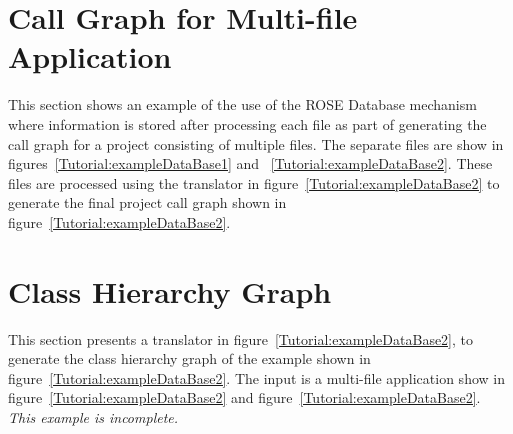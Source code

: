 \section{Call Graph for Multi-file Application}

   This section shows an example of the use of the ROSE Database mechanism
where information is stored after processing each file as part of generating the
call graph for a project consisting of multiple files.  The separate files
are show in figures~\ref{Tutorial:exampleDataBase1} and ~\ref{Tutorial:exampleDataBase2}.
These files are processed using the translator in figure~\ref{Tutorial:exampleDataBase2}
to generate the final project call graph shown in figure~\ref{Tutorial:exampleDataBase2}.



\section{Class Hierarchy Graph}

   This section presents a translator in figure~\ref{Tutorial:exampleDataBase2}, to
generate the class hierarchy graph of the example shown in
figure~\ref{Tutorial:exampleDataBase2}. The input is a multi-file application
show in figure~\ref{Tutorial:exampleDataBase2} and 
figure~\ref{Tutorial:exampleDataBase2}. {\em This example is incomplete.}


